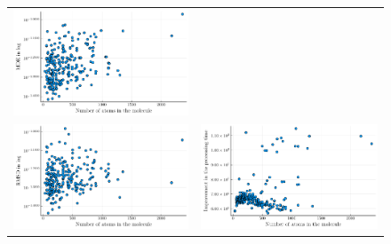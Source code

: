 \documentclass[a4paper,11pt]{article}
\begin{document}
\begin{figure}[H]
\begin{tabular}{cc}
			\includegraphics[scale=0.55]{figures/MDEQuaternion.pdf} \\
			\includegraphics[scale=0.55]{figures/RMSD.pdf} &
			\includegraphics[scale=0.55]{figures/improv.pdf} \\

\end{tabular}
\end{figure}
\end{document}
